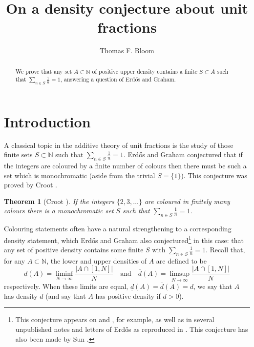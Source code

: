 \documentclass[12pt]{amsart}
\newcommand{\bbn}{\mathbb{N}}
\newcommand{\abs}[1]{\left\lvert #1\right\rvert}
\newtheorem{theorem}{Theorem}
\begin{document}
\title{On a density conjecture about unit fractions}
\author{Thomas F. Bloom}
\address{Mathematical Institute\\Woodstock Road\\Oxford\\OX2 6GG, United Kingdom}

\begin{abstract}
We prove that any set $A\subset \bbn$ of positive upper density contains a finite $S\subset A$ such that $\sum_{n\in S}\frac{1}{n}=1$, answering a question of Erd\H{o}s and Graham.
\end{abstract}


\maketitle



\section{Introduction}

A classical topic in the additive theory of unit fractions is the study of those finite sets $S\subset \bbn$ such that $\sum_{n\in S}\frac{1}{n}=1$. Erd\H{o}s and Graham \cite{ErGr1980} conjectured that if the integers are coloured by a finite number of colours then there must be such a set which is monochromatic (aside from the trivial $S=\{1\}$). This conjecture was proved by Croot \cite{Cr2003}. 
\begin{theorem}[Croot \cite{Cr2003}]\label{th-croot}
If the integers $\{2,3,\ldots\}$ are coloured in finitely many colours there is a monochromatic set $S$ such that $\sum_{n\in S}\frac{1}{n}=1$.
\end{theorem}
Colouring statements often have a natural strengthening to a corresponding density statement, which Erd\H{o}s and Graham also conjectured\footnote{This conjecture appears on \cite[p. 36]{ErGr1980} and \cite[p. 298]{Gr2013}, for example, as well as in several unpublished notes and letters of Erd\H{o}s as reproduced in \cite{Gr2013}. This conjecture has also been made by Sun \cite{Su2007}.} in this case: that any set of positive density contains some finite $S$ with $\sum_{n\in S}\frac{1}{n}=1$. Recall that, for any $A\subset \bbn$, the lower and upper densities of $A$ are defined to be
\[\underline{d}(A) = \liminf_{N\to\infty}\frac{\abs{A\cap [1,N]}}{N}\quad\textrm{and}\quad\overline{d}(A) = \limsup_{N\to\infty}\frac{\abs{A\cap [1,N]}}{N}\]
respectively. When these limits are equal, $\underline{d}(A)=\overline{d}(A)=d$, we say that $A$ has density $d$ (and say that $A$ has positive density if $d>0$).
\end{document}
